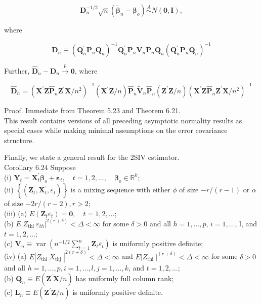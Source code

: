 \documentclass[10pt]{article}
\begin{document}
$$
\mathbf{D}_{n}^{-1 / 2} \sqrt{n}\left(\tilde{\boldsymbol{\beta}}_{n}-\boldsymbol{\beta}_{o}\right) \stackrel{A}{\sim} N(\mathbf{0}, \mathbf{I}),
$$

where

$$
\mathbf{D}_{n} \equiv\left(\mathbf{Q}_{n}^{\prime} \mathbf{P}_{n} \mathbf{Q}_{n}\right)^{-1} \mathbf{Q}_{n}^{\prime} \mathbf{P}_{n} \mathbf{V}_{n} \mathbf{P}_{n} \mathbf{Q}_{n}\left(\mathbf{Q}_{n}^{\prime} \mathbf{P}_{n} \mathbf{Q}_{n}\right)^{-1}
$$

Further, $\hat{\mathbf{D}}_{n}-\mathbf{D}_{n} \xrightarrow{p} \mathbf{0}$, where

$$
\hat{\mathbf{D}}_{n}=\left(\mathbf{X}^{\prime} \mathbf{Z} \hat{\mathbf{P}}_{n} \mathbf{Z}^{\prime} \mathbf{X} / n^{2}\right)^{-1}\left(\mathbf{X}^{\prime} \mathbf{Z} / n\right) \hat{\mathbf{P}}_{n} \tilde{\mathbf{V}}_{n} \hat{\mathbf{P}}_{n}\left(\mathbf{Z}^{\prime} \mathbf{Z} / n\right)\left(\mathbf{X}^{\prime} \mathbf{Z} \hat{\mathbf{P}}_{n} \mathbf{Z}^{\prime} \mathbf{X} / n^{2}\right)^{-1}
$$

Proof. Immediate from Theorem 5.23 and Theorem 6.21.\\
This result contains versions of all preceding asymptotic normality results as special cases while making minimal assumptions on the error covariance structure.

Finally, we state a general result for the 2SIV estimator.\\
Corollary 6.24 Suppose\\
(i) $\mathbf{Y}_{t}=\mathbf{X}_{t}^{\prime} \boldsymbol{\beta}_{o}+\boldsymbol{\varepsilon}_{t}, \quad t=1,2, \ldots, \quad \boldsymbol{\beta}_{o} \in \mathbb{R}^{k} ;$\\
(ii) $\left\{\left(\mathbf{Z}_{t}^{\prime}, \mathbf{X}_{t}^{\prime}, \varepsilon_{t}\right)\right\}$ is a mixing sequence with either $\phi$ of size $-r /(r-1)$ or $\alpha$ of size $-2 r /(r-2), r>2$;\\
(iii) (a) $E\left(\mathbf{Z}_{t} \varepsilon_{t}\right)=\mathbf{0}, \quad t=1,2, \ldots$;\\
(b) $E\left|Z_{\text {thi }} \varepsilon_{t h}\right|^{2(r+\delta)}<\Delta<\infty$ for some $\delta>0$ and all $h=1, \ldots, p$, $i=1, \ldots$, l, and $t=1,2, \ldots$;\\
(c) $\mathbf{V}_{n} \equiv \operatorname{var}\left(n^{-1 / 2} \sum_{t=1}^{n} \mathbf{Z}_{t} \varepsilon_{t}\right)$ is uniformly positive definite;\\
(iv) (a) $E\left|Z_{\text {thi }} X_{\text {thj }}\right|^{2(r+\delta)}<\Delta<\infty$ and $E\left|Z_{\text {thi }}\right|^{(r+\delta)}<\Delta<\infty$ for some $\delta>0$ and all $h=1, \ldots, p, i=1, \ldots, l, j=1, \ldots, k$, and $t=1,2, \ldots$;\\
(b) $\mathbf{Q}_{n} \equiv E\left(\mathbf{Z}^{\prime} \mathbf{X} / n\right)$ has uniformly full column rank;\\
(c) $\mathbf{L}_{n} \equiv E\left(\mathbf{Z}^{\prime} \mathbf{Z} / n\right)$ is uniformly positive definite.
\end{document}
